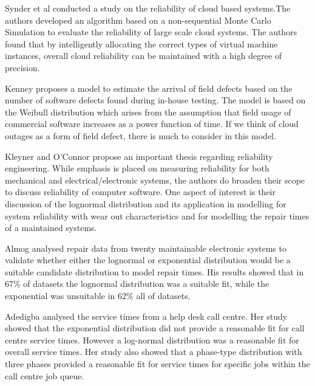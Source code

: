 \documentclass[5p]{elsarticle}
\begin{document}
Synder et al \cite{snyder2015evaluation} conducted a study on the reliability of cloud based systems.The authors developed an algorithm based on a non-sequential Monte Carlo Simulation to evaluate the reliability of large scale cloud systems. The authors found that by intelligently allocating the correct types of virtual machine instances, overall cloud reliability can be maintained with a high degree of precision. \par

Kenney \cite{kenny1993estimating} proposes a model to estimate the arrival of field defects based on the number of software defects found during in-house testing. The model is based on the Weibull distribution which arises from the assumption that field usage of commercial software increases as a power function of time. If we think of cloud outages as a form of field defect, there is much to consider in this model. \par 

Kleyner and O'Connor \cite{o2011practical} propose an important thesis regarding reliability engineering. While emphasis is placed on measuring reliability for both mechanical and electrical/electronic systems, the authors do broaden their scope to discuss reliability of computer software. One aspect of interest is their discussion of the lognormal distribution and its application in modelling for system reliability with wear out characteristics and for modelling the repair times of a maintained systems. \par

Almog \cite{almog1979study} analysed repair data from twenty maintainable electronic systems to validate whether either the lognormal or exponential distribution would be a suitable candidate distribution to model repair times. His results showed that in 67\% of datasets the lognormal distribution was a suitable fit, while the exponential was unsuitable in 62\% all of datasets. \par

Adedigba \cite{adedigba2005statistical} analysed the service times from a help desk call centre. Her study showed that the exponential distribution did not provide a reasonable fit for call centre service times. However a log-normal distribution was a reasonable fit for overall service times. Her study also showed that a phase-type distribution with three phases provided a reasonable fit for service times for specific jobs within the call centre job queue. \par
\end{document}
